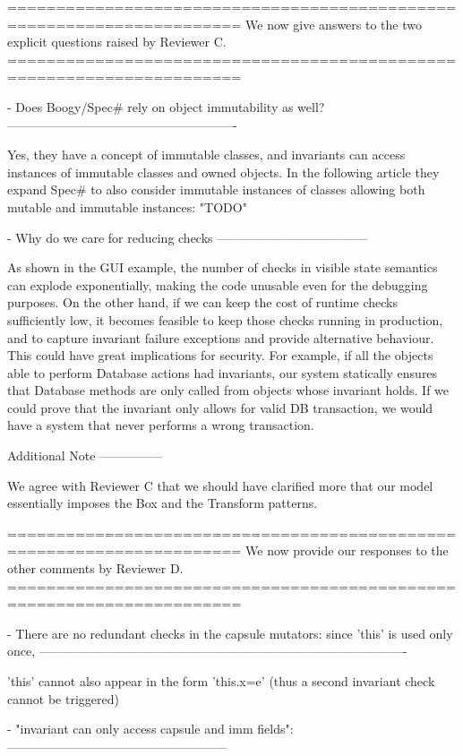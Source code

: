 ======================================================================
We now give answers to the two explicit questions raised by Reviewer C.
======================================================================

- Does Boogy/Spec# rely on object immutability as well?
-------------------------------------------------------

Yes, they have a concept of immutable classes, and invariants can access instances of
immutable classes and owned objects. In the following article they expand Spec# to also
consider immutable instances of classes allowing both mutable and immutable instances: "TODO"

- Why do we care for reducing checks
------------------------------------

As shown in the GUI example, the number of checks in visible state semantics can explode
exponentially, making the code unusable even for the debugging purposes.
On the other hand, if we can keep the cost of runtime checks sufficiently low,
it becomes feasible to keep those checks running in production,
and to capture invariant failure exceptions and provide alternative behaviour.
This could have great implications for security.
For example, if all the objects able to perform Database actions had invariants,
our system statically ensures that Database methods are only called from objects whose invariant holds.
If we could prove that the invariant only allows for valid DB transaction, we would have a system
that never performs a wrong transaction.

Additional Note
---------------

We agree with Reviewer C that we should have clarified more that our model essentially imposes the Box and the Transform patterns.

======================================================================
We now provide our responses to the other comments by Reviewer D.
======================================================================

- There are no redundant checks in the capsule mutators: since 'this' is used only once,
----------------------------------------------------------------------------------------

'this' cannot also appear in the form 'this.x=e' (thus a second invariant check cannot be triggered)

- "invariant can only access capsule and imm fields":
-----------------------------------------------------

